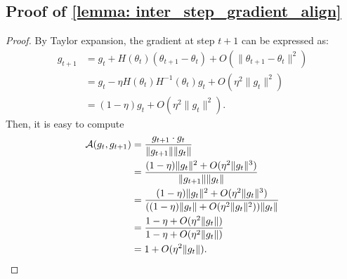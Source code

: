\subsection{Proof of \cref{lemma: inter_step_gradient_align}} \label{proof: lemma_inter_step_gradient_align}
\begin{proof}
By Taylor expansion, the gradient at step $t+1$ can be expressed as:
\begin{align*}
g_{t+1} &= g_t + H(\theta_t)(\theta_{t+1} - \theta_t) + O(\|\theta_{t+1} - \theta_t\|^2) \\
&= g_t - \eta H(\theta_t)H^{-1}(\theta_t) g_t + O(\eta^2\|g_t\|^2) \\
&= (1-\eta)g_t + O(\eta^2\|g_t\|^2).
\end{align*}    
Then, it is easy to compute 
\begin{align*}
    \mathcal{A}(g_t, g_{t+1}) &= \frac{g_{t+1} \cdot g_t}{\|g_{t+1}\|\|g_t\|} \\
&= \frac{(1-\eta)\|g_t\|^2 + O(\eta^2\|g_t\|^3)}{\|g_{t+1}\|\|g_t\|}  \\
&= \frac{(1-\eta)\|g_t\|^2 + O(\eta^2\|g_t\|^3)}{((1-\eta)\|g_t\| + O(\eta^2\|g_t\|^2))\|g_t\|} \\
&= \frac{1-\eta + O(\eta^2\|g_t\|)}{1-\eta + O(\eta^2\|g_t\|)} \\
&= 1 + O(\eta^2\|g_t\|). \qedhere
\end{align*}
\end{proof}

